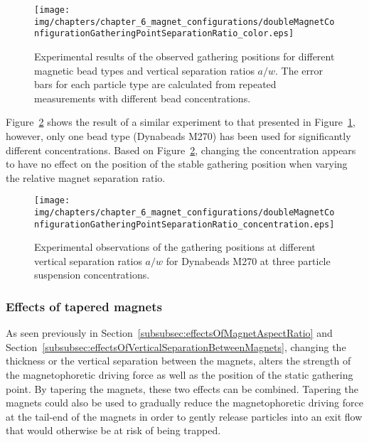 \begin{figure}[htb]
\centering
	\texttt{[image: img/chapters/chapter\_6\_magnet\_configurations/doubleMagnetConfigurationGatheringPointSeparationRatio\_color.eps]}
\caption[Observed gathering position as a function of the magnet separation ratio for different particle types]{Experimental results of the observed gathering positions for different magnetic bead types and vertical separation ratios $a/w$. The error bars for each particle type are calculated from repeated measurements with different bead concentrations.}
\label{fig:stableGatheringPointSeparationRatioParticle}
\end{figure}

Figure~\ref{fig:stableGatheringPointSeparationRatioConcentration} shows the result of a similar experiment to that presented in Figure~\ref{fig:stableGatheringPointSeparationRatioParticle}, however, only one bead type (Dynabeads M270) has been used for significantly different concentrations. Based on Figure~\ref{fig:stableGatheringPointSeparationRatioConcentration}, changing the concentration appears to have no effect on the position of the stable gathering position when varying the relative magnet separation ratio.

\begin{figure}[htb]
\centering
	\texttt{[image: img/chapters/chapter\_6\_magnet\_configurations/doubleMagnetConfigurationGatheringPointSeparationRatio\_concentration.eps]}
\caption[Gathering positions as a function of the magnet separation ratio for different particle suspension concentration]{Experimental observations of the gathering positions at different vertical separation ratios $a/w$ for Dynabeads M270 at three particle suspension concentrations.}
\label{fig:stableGatheringPointSeparationRatioConcentration}
\end{figure}

\subsubsection{Effects of tapered magnets}\label{subsubsec:effectsOfTaperedMagnets}
As seen previously in Section~\ref{subsubsec:effectsOfMagnetAspectRatio} and Section~\ref{subsubsec:effectsOfVerticalSeparationBetweenMagnets}, changing the thickness or the vertical separation between the magnets, alters the strength of the magnetophoretic driving force as well as the position of the static gathering point. By tapering the magnets, these two effects can be combined. Tapering the magnets could also be used to gradually reduce the magnetophoretic driving force at the tail-end of the magnets in order to gently release particles into an exit flow that would otherwise be at risk of being trapped.

